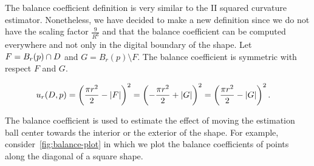 The balance coefficient definition is very similar to the II squared curvature estimator. Nonetheless, we have decided to make a new definition since we do not have the scaling factor $\frac{9}{R^6}$ and that the balance coefficient can be computed everywhere and not only in the digital boundary of the shape. Let $F=B_r(p) \cap D$ and $G=B_r(p) \setminus F$. The balance coefficient is symmetric with respect $F$ and $G$. 

\begin{align*}
	u_r(D,p) &= \left( \frac{\pi r^2}{2} - |F| \right)^2 = \left( -\frac{\pi r^2}{2} + |G| \right)^2 = \left( \frac{\pi r^2}{2} - |G| \right)^2.
\end{align*}

The balance coefficient is used to estimate the effect of moving the estimation ball center towards the interior or the exterior of the shape. For example, consider~\cref{fig:balance-plot} in which we plot the balance coefficients of points along the diagonal of a square shape. 

